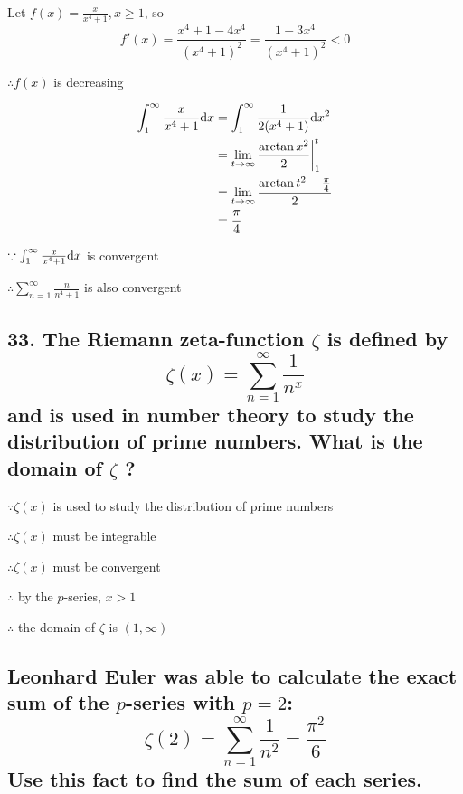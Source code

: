 \documentclass{article}
\begin{document}
    Let $f(x) = \frac{x}{x^4+1}, x \geq 1$, so $$f'(x) = \frac{x^4+1 - 4x^4}{(x^4+1)^2} = \frac{1 - 3x^4}{(x^4+1)^2} < 0$$

    $\therefore f(x)$ is decreasing

    $$\begin{aligned}
        \int_1^\infty \frac{x}{x^4+1} \textrm dx &= \int_1^\infty \frac{1}{2(x^4+1)} \textrm dx^2 \\
        &= \lim_{t \to \infty} \frac{\arctan x^2}{2} \biggl|_1^t \\
        &= \lim_{t \to \infty} \frac{\arctan t^2 - \frac \pi 4}{2} \\
        &= \frac \pi 4
    \end{aligned}$$

    $\because \int_1^\infty \frac{x}{x^4+1} \textrm dx$ is convergent

    $\therefore \sum_{n=1}^\infty \frac{n}{n^4+1}$ is also convergent

    \subsection*{33. The Riemann zeta-function $\zeta$ is defined by $$\zeta (x) = \sum_{n=1}^\infty \frac{1}{n^x}$$and is used in number theory to study the distribution of prime numbers. What is the domain of $\zeta$ ?}

    $\because \zeta (x)$ is used to study the distribution of prime numbers

    $\therefore \zeta (x)$ must be integrable

    $\therefore \zeta (x)$ must be convergent

    $\therefore$ by the $p$-series, $x>1$

    $\therefore$ the domain of $\zeta$ is $(1, \infty)$

    \subsection*{Leonhard Euler was able to calculate the exact sum of the $p$-series with $p = 2$:$$\zeta(2) = \sum_{n=1}^\infty \frac{1}{n^2} = \frac{\pi ^2}{6}$$ Use this fact to find the sum of each series.}
\end{document}
